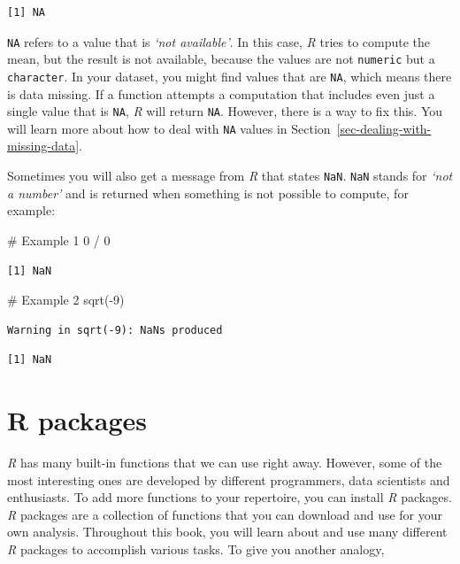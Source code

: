 \documentclass[
  letterpaper,
]{krantz}
\makeatletter
\newenvironment{Shaded}{\begin{snugshade}}{\end{snugshade}}
\newcommand{\CommentTok}[1]{\textcolor[rgb]{0.37,0.37,0.37}{#1}}
\newcommand{\DecValTok}[1]{\textcolor[rgb]{0.68,0.00,0.00}{#1}}
\newcommand{\FunctionTok}[1]{\textcolor[rgb]{0.28,0.35,0.67}{#1}}
\newcommand{\NormalTok}[1]{\textcolor[rgb]{0.00,0.23,0.31}{#1}}
\newcommand{\SpecialCharTok}[1]{\textcolor[rgb]{0.37,0.37,0.37}{#1}}
\newenvironment{kframe}{%
\medskip{}
\setlength{\fboxsep}{.8em}
 \def\at@end@of@kframe{}%
 \ifinner\ifhmode%
  \def\at@end@of@kframe{\end{minipage}}%
  \begin{minipage}{\columnwidth}%
 \fi\fi%
 \def\FrameCommand##1{\hskip\@totalleftmargin \hskip-\fboxsep
 \colorbox{shadecolor}{##1}\hskip-\fboxsep
     \hskip-\linewidth \hskip-\@totalleftmargin \hskip\columnwidth}%
 \MakeFramed {\advance\hsize-\width
   \@totalleftmargin\z@ \linewidth\hsize
   \@setminipage}}%
 {\par\unskip\endMakeFramed%
 \at@end@of@kframe}
\renewenvironment{Shaded}{\begin{kframe}}{\end{kframe}}
\makeatother
\begin{document}
\begin{verbatim}
[1] NA
\end{verbatim}

\texttt{NA} refers to a value that is \emph{`not available'}. In this
case, \emph{R} tries to compute the mean, but the result is not
available, because the values are not \texttt{numeric} but a
\texttt{character}. In your dataset, you might find values that are
\texttt{NA}, which means there is data missing. If a function attempts a
computation that includes even just a single value that is \texttt{NA},
\emph{R} will return \texttt{NA}. However, there is a way to fix this.
You will learn more about how to deal with \texttt{NA} values in
Section~\ref{sec-dealing-with-missing-data}.

Sometimes you will also get a message from \emph{R} that states
\texttt{NaN}. \texttt{NaN} stands for \emph{`not a number'} and is
returned when something is not possible to compute, for example:

\begin{Shaded}
\begin{Highlighting}[]
\CommentTok{\# Example 1}
\DecValTok{0} \SpecialCharTok{/} \DecValTok{0}
\end{Highlighting}
\end{Shaded}

\begin{verbatim}
[1] NaN
\end{verbatim}

\begin{Shaded}
\begin{Highlighting}[]
\CommentTok{\# Example 2}
\FunctionTok{sqrt}\NormalTok{(}\SpecialCharTok{{-}}\DecValTok{9}\NormalTok{)}
\end{Highlighting}
\end{Shaded}

\begin{verbatim}
Warning in sqrt(-9): NaNs produced
\end{verbatim}

\begin{verbatim}
[1] NaN
\end{verbatim}

\section{R packages}\label{sec-r-packages}

\emph{R} has many built-in functions that we can use right away.
However, some of the most interesting ones are developed by different
programmers, data scientists and enthusiasts. To add more functions to
your repertoire, you can install \emph{R} packages. \emph{R} packages
are a collection of functions that you can download and use for your own
analysis. Throughout this book, you will learn about and use many
different \emph{R} packages to accomplish various tasks. To give you
another analogy,
\end{document}
